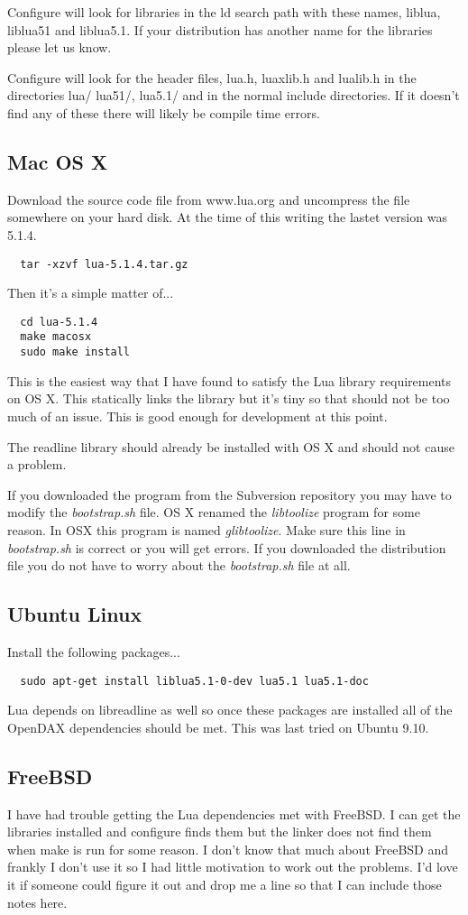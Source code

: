 Configure will look for libraries in the ld search path with these names, liblua, liblua51 and liblua5.1. If your distribution has another name for the libraries please let us know.

Configure will look for the header files, lua.h, luaxlib.h and lualib.h in the directories lua/ lua51/, lua5.1/ and in the normal include directories. If it doesn't find any of these there will likely be compile time errors.

\subsection{Mac OS X}
Download the source code file from www.lua.org and uncompress the file somewhere on your hard disk. At the time of this writing the lastet version was 5.1.4.
\begin{verbatim}
  tar -xzvf lua-5.1.4.tar.gz
\end{verbatim}

Then it's a simple matter of...
\begin{verbatim}
  cd lua-5.1.4
  make macosx
  sudo make install
\end{verbatim}

This is the easiest way that I have found to satisfy the Lua library requirements on OS X. This statically links the library but it's tiny so that should not be too much of an issue. This is good enough for development at this point.

The readline library should already be installed with OS X and should not cause a problem.

If you downloaded the program from the Subversion repository you may have to modify the \emph{bootstrap.sh} file.  OS X renamed the \emph{libtoolize} program for some reason.  In OSX this program is named \emph{glibtoolize}.  Make sure this line in \emph{bootstrap.sh} is correct or you will get errors.  If you downloaded the distribution file you do not have to worry about the \emph{bootstrap.sh} file at all.
\subsection{Ubuntu Linux}

Install the following packages...
\begin{verbatim}
  sudo apt-get install liblua5.1-0-dev lua5.1 lua5.1-doc
\end{verbatim}
Lua depends on libreadline as well so once these packages are installed all of the OpenDAX dependencies should be met. This was last tried on Ubuntu 9.10.
\subsection{FreeBSD}

I have had trouble getting the Lua dependencies met with FreeBSD. I can get the libraries installed and configure finds them but the linker does not find them when make is run for some reason. I don't know that much about FreeBSD and frankly I don't use it so I had little motivation to work out the problems. I'd love it if someone could figure it out and drop me a line so that I can include those notes here. 
